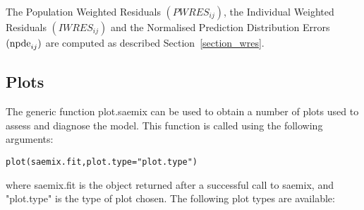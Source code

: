 The Population Weighted Residuals $(PWRES_{ij})$,  the Individual Weighted Residuals $(IWRES_{ij})$ and the Normalised Prediction Distribution Errors $({\rm npde}_{ij})$ are computed as described Section~\ref{section_wres}.

\newpage
\subsection{Plots} \label{sec:plot.functions}

The generic function {\sf plot.saemix} can be used to obtain a number of plots used to assess and diagnose the model. This function is called using the following arguments:
\begin{verbatim}
plot(saemix.fit,plot.type="plot.type")
\end{verbatim}
where {\sf saemix.fit} is the object returned after a successful call to {\sf saemix}, and {\sf "plot.type"} is the type of plot chosen. The following plot types are available:
